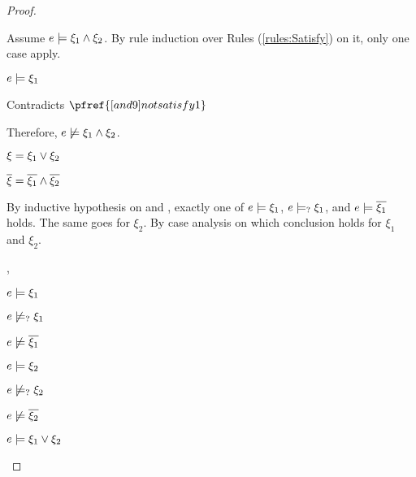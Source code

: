 \begin{proof}
\begin{byCases}
\begin{byCases}
        Assume $e \models \xi_1 \wedge \xi_2$. By rule induction over Rules (\ref{rules:Satisfy}) on it, only one case apply.
        \begin{byCases}
        \item[\text{(\ref{rule:CSAnd})}]
            \begin{pfsteps*}
            \item $e \models \xi_1$ 
            \end{pfsteps*}
            Contradicts $\pfref{[and9]notsatisfy1}$
        \end{byCases}
        Therefore, $e \not\models \xi_1 \wedge \xi_2$.
    \end{byCases}
    
\item[\text{(\ref{rule:CTOr})}]
    \begin{pfsteps*}
    \item $\xi=\xi_1 \vee \xi_2$ 
    \item $\overline{\xi}=\overline{\xi_1} \wedge \overline{\xi_2}$ 
    \end{pfsteps*}
    By inductive hypothesis on  and , exactly one of $e \models \xi_1$, $e \models_{?} \xi_1$, and $e \models \overline{\xi_1}$ holds. The same goes for $\xi_2$. By case analysis on which conclusion holds for $\xi_1$ and $\xi_2$.
    \begin{byCases}
    \item[\csatisfy{e}{\xi_1},\csatisfy{e}{\xi_2}]
        \begin{pfsteps*}
        \item $e \models \xi_1$  
        \item $e \not\models_{?} \xi_1$  
        \item $e \not\models \overline{\xi_1}$  
        \item $e \models \xi_2$  
        \item $e \not\models_{?} \xi_2$  
        \item $e \not\models \overline{\xi_2}$  
        \item $e \models \xi_1 \vee \xi_2$  

\end{pfsteps*}
\end{byCases}
\end{byCases}
\end{proof}
